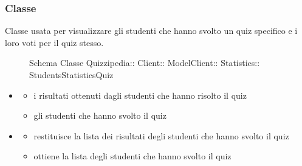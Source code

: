 \subsubsection{Classe }
Classe usata per visualizzare gli studenti che hanno svolto un quiz specifico e i loro voti per il quiz stesso.
\begin{figure}[H]
\centering
\noindent{}
\caption[Schema Classe StudentsStatisticsQuiz]{Schema Classe Quizzipedia:: Client:: ModelClient:: Statistics:: StudentsStatisticsQuiz}
\end{figure}
\begin{itemize}
\item {}
\begin{itemize}
\item {}
\newline
i risultati ottenuti dagli studenti che hanno risolto il quiz
\item {}
\newline
gli studenti che hanno svolto il quiz
\end{itemize}
\item {}
\begin{itemize}
\item {}
\newline
restituisce la lista dei risultati degli studenti che hanno svolto il quiz
\newline
\item {}
\newline
ottiene la lista degli studenti che hanno svolto il quiz
\newline
\end{itemize}
\end{itemize}
